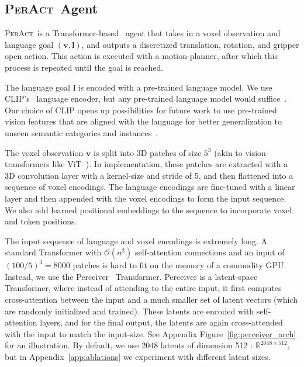 \documentclass{article}
\newcommand{\appsecref}[1]{Appendix~\ref{#1}}
\newcommand{\appfigref}[1]{Appendix Figure~\ref{#1}}
\newcommand{\inputvl}{$(\mathbf{v}, \mathbf{l})$}
\newcommand{\model}{\textsc{PerAct}}
\begin{document}
\subsection{\model~Agent} \label{sec:peract}
\vspace{-0.2cm}
\model~is a Transformer-based~\citep{vaswani2017attention} agent that takes in a voxel observation and language goal \inputvl, and outputs a discretized translation, rotation, and gripper open action. This action is executed with a motion-planner, after which this process is repeated until the goal is reached.

The language goal $\mathbf{l}$ is encoded with a pre-trained language model. 
We use CLIP's~\citep{radfordLearningTransferableVisual2021} language encoder, but any pre-trained language model would suffice~\citep{ahn2022can,lynch2020grounding}. Our choice of CLIP opens up possibilities for future work to use pre-trained vision features that are aligned with the language for better generalization to unseen semantic categories and instances~\citep{cliport}. 

The voxel observation $\mathbf{v}$ is split into 3D patches of size $5^3$ (akin to vision-transformers like ViT~\citep{dosovitskiy2020image}). In implementation, these  patches are extracted with a 3D convolution layer with a kernel-size and stride of 5, and then flattened into a sequence of voxel encodings. The language encodings are fine-tuned with a linear layer and then appended with the voxel encodings to form the input sequence. We also add learned positional embeddings to the sequence to incorporate voxel and token positions.

The input sequence of language and voxel encodings is extremely long. 
A standard Transformer with $\mathcal{O}(n^2)$ self-attention connections and an input of  $(100/5)^3 = 8000$ patches is hard to fit on the memory of a commodity GPU.  
Instead, we use the Perceiver~\citep{jaegle2021perceiver} Transformer. Perceiver is a latent-space Transformer, where instead of attending to the entire input, it first computes cross-attention between the input and a much smaller set of latent vectors (which are randomly initialized and trained). These latents are encoded with self-attention layers, and for the final output, the latents are again cross-attended with the input to match the input-size. See \appfigref{fig:perceiver_arch} for an illustration. By default, we use $2048$ latents of dimension 512 : $\mathbb{R}^{2048 \times 512}$, but in \appsecref{app:ablations} we experiment with different latent sizes. 
\end{document}

